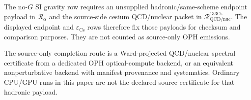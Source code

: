 \begin{remark}\label{rem:hadronic-clock-boundary}
The no-\(G\) SI gravity row requires an unsupplied hadronic/same-scheme
endpoint payload in \(\mathcal R_\alpha\) and the source-side cesium QCD/nuclear packet in
\(\mathcal R_{\mathrm{QCD/nuc}}^{133\mathrm{Cs}}\).  The displayed endpoint and
\(\varepsilon_{\mathrm{Cs}}\) rows therefore fix those payloads for checksum and comparison
purposes.  They are not counted as source-only OPH emissions.

The source-only completion route is a Ward-projected QCD/nuclear spectral certificate from a
dedicated OPH optical-compute backend, or an equivalent nonperturbative backend with manifest
provenance and systematics.  Ordinary CPU/GPU runs in this paper are not the declared source
certificate for that hadronic payload.
\end{remark}



